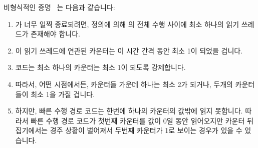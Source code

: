 비형식적인 증명~\cite{PaulMcKenney2007QRCUpatch} 는 다음과 같습니다:
\iffalse

An informal proof~\cite{PaulMcKenney2007QRCUpatch}
follows:
\fi

\begin{enumerate}
\item	{} 가 너무 일찍 종료되려면, 정의에 의해
	 의 전체 수행 사이에 최소 하나의 읽기 쓰레드가
	존재해야 합니다.
\item	이 읽기 쓰레드에 연관된 카운터는 이 시간 간격 동안 최소 1이 되었을
	겁니다.
\item	{} 코드는 최소 하나의 카운터는 최소 1이 되도록
	강제합니다.
\item	따라서, 어떤 시점에서든, 카운터들 가운데 하나는 최소 2가 되거나, 두개의
	카운터들이 최소 1을 가질 겁니다.
\item	하지만,  빠른 수행 경로 코드는 한번에 하나의
	카운터의 값밖에 읽지 못합니다.
	따라서 빠른 수행 경로 코드가 첫번째 카운터를 값이 0일 동안 읽어오지만
	카운터 뒤집기에서는 경주 상황이 벌어져서 두번째 카운터가 1로 보이는
	경우가 있을 수 있습니다.
\iffalse


\end{enumerate}
